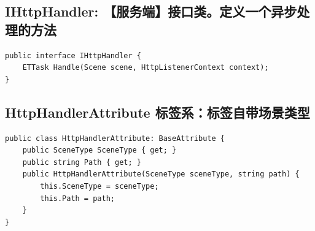 \documentclass[9pt, b5paper]{article}
\begin{document}
\subsection{IHttpHandler: 【服务端】接口类。定义一个异步处理的方法}
\label{sec:org9cb3f49}
\begin{verbatim}
public interface IHttpHandler {
    ETTask Handle(Scene scene, HttpListenerContext context);
}
\end{verbatim}
\subsection{HttpHandlerAttribute 标签系：标签自带场景类型}
\label{sec:org417dfaf}
\begin{verbatim}
public class HttpHandlerAttribute: BaseAttribute {
    public SceneType SceneType { get; }
    public string Path { get; }
    public HttpHandlerAttribute(SceneType sceneType, string path) {
        this.SceneType = sceneType;
        this.Path = path;
    }
}
\end{verbatim}
\end{document}
